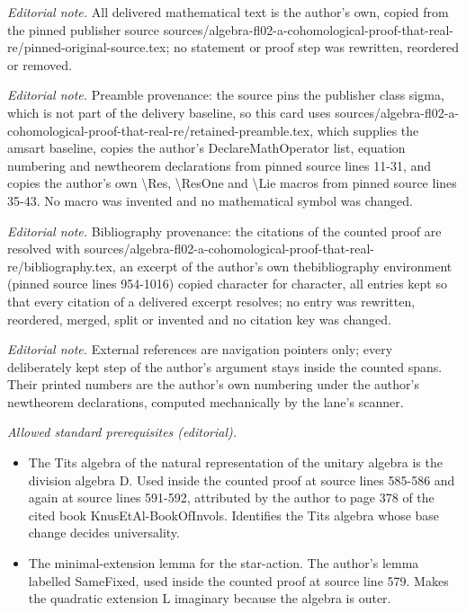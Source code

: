 \maketitle
\noindent\textit{Editorial note.} All delivered mathematical text is the author's own, copied from the pinned publisher source sources/algebra-fl02-a-cohomological-proof-that-real-re/pinned-original-source.tex; no statement or proof step was rewritten, reordered or removed.\par\medskip
\noindent\textit{Editorial note.} Preamble provenance: the source pins the publisher class sigma, which is not part of the delivery baseline, so this card uses sources/algebra-fl02-a-cohomological-proof-that-real-re/retained-preamble.tex, which supplies the amsart baseline, copies the author's DeclareMathOperator list, equation numbering and newtheorem declarations from pinned source lines 11-31, and copies the author's own \textbackslash{}Res, \textbackslash{}ResOne and \textbackslash{}Lie macros from pinned source lines 35-43. No macro was invented and no mathematical symbol was changed.\par\medskip
\noindent\textit{Editorial note.} Bibliography provenance: the citations of the counted proof are resolved with sources/algebra-fl02-a-cohomological-proof-that-real-re/bibliography.tex, an excerpt of the author's own thebibliography environment (pinned source lines 954-1016) copied character for character, all entries kept so that every citation of a delivered excerpt resolves; no entry was rewritten, reordered, merged, split or invented and no citation key was changed.\par\medskip
\noindent\textit{Editorial note.} External references are navigation pointers only; every deliberately kept step of the author's argument stays inside the counted spans. Their printed numbers are the author's own numbering under the author's newtheorem declarations, computed mechanically by the lane's scanner.\par\medskip
\noindent\textit{Allowed standard prerequisites (editorial).}\begin{itemize}
\item The Tits algebra of the natural representation of the unitary algebra is the division algebra D. Used inside the counted proof at source lines 585-586 and again at source lines 591-592, attributed by the author to page 378 of the cited book KnusEtAl-BookOfInvols. Identifies the Tits algebra whose base change decides universality.
\item The minimal-extension lemma for the star-action. The author's lemma labelled SameFixed, used inside the counted proof at source line 579. Makes the quadratic extension L imaginary because the algebra is outer.
\end{itemize}\medskip
